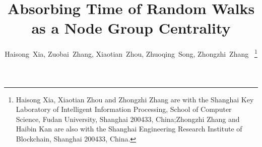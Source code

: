 \documentclass[journal]{IEEEtran}
\begin{document}
\title{Absorbing Time of Random Walks as a Node Group Centrality}
\author{Haisong~Xia,
    Zuobai~Zhang,
    Xiaotian~Zhou,
    Zhuoqing~Song,
    Zhongzhi~Zhang~
    \thanks{Haisong Xia, Xiaotian Zhou and Zhongzhi Zhang are with the Shanghai Key Laboratory of Intelligent Information Processing, School of Computer Science, Fudan University, Shanghai 200433, China;Zhongzhi Zhang and Haibin Kan are also with the Shanghai Engineering Research Institute of Blockchain, Shanghai 200433, China.}
}

\maketitle

\begin{abstract}

\end{abstract}

\begin{IEEEkeywords}

\end{IEEEkeywords}
\end{document}
